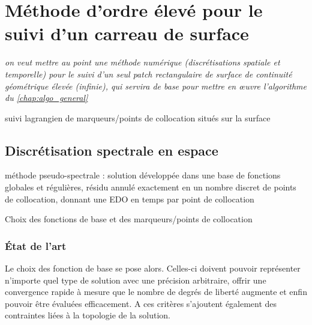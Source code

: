 \chapter{Méthode d'ordre élevé pour le suivi d'un carreau de surface}%
\label{chap:methode_ps}

\textit{on veut mettre au point une méthode numérique (discrétisations spatiale et temporelle) pour le suivi d'un seul patch rectangulaire de surface de continuité géométrique élevée (infinie), qui servira de base pour  mettre en \oe uvre l'algorithme du \autoref{chap:algo_general}}
\par\bigskip

suivi lagrangien de marqueurs/points de collocation situés sur la surface

\section{Discrétisation spectrale en espace}%
méthode pseudo-spectrale : solution développée dans une base de fonctions globales et régulières, résidu annulé exactement en un nombre discret de points de collocation, donnant une EDO en temps par point de collocation\par
Choix des fonctions de base et des marqueurs/points de collocation\par

\subsection{État de l'art}
Le choix des fonction de base se pose alors. Celles-ci doivent pouvoir représenter n'importe quel type de solution avec une précision arbitraire, offrir une convergence rapide à mesure que le nombre de degrés de liberté augmente et enfin pouvoir être évaluées efficacement. A ces critères s'ajoutent également des contraintes liées à la topologie de la solution.\par

